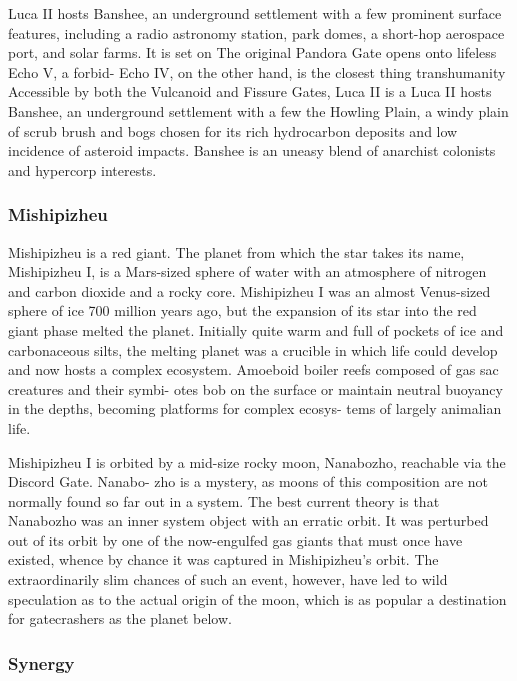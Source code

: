 Luca II hosts Banshee, an underground settlement with a few 
prominent surface features, including a radio astronomy station, 
park domes, a short-hop aerospace port, and solar farms. It is set on 
The original Pandora Gate opens onto lifeless Echo V, a forbid-
Echo IV, on the other hand, is the closest thing transhumanity 
Accessible by both the Vulcanoid and Fissure Gates, Luca II is a 
Luca II hosts Banshee, an underground settlement with a few 
the Howling Plain, a windy plain of scrub brush and 
bogs chosen for its rich hydrocarbon deposits and low 
incidence of asteroid impacts. Banshee is an uneasy 
blend of anarchist colonists and hypercorp interests.

\subsubsection{Mishipizheu}

Mishipizheu is a red giant. The planet from which 
the star takes its name, Mishipizheu I, is a Mars-sized 
sphere of water with an atmosphere of nitrogen and 
carbon dioxide and a rocky core. Mishipizheu I was 
an almost Venus-sized sphere of ice 700 million years 
ago, but the expansion of its star into the red giant 
phase melted the planet. Initially quite warm and full 
of pockets of ice and carbonaceous silts, the melting 
planet was a crucible in which life could develop and 
now hosts a complex ecosystem. Amoeboid boiler 
reefs composed of gas sac creatures and their symbi-
otes bob on the surface or maintain neutral buoyancy 
in the depths, becoming platforms for complex ecosys-
tems of largely animalian life.

Mishipizheu I is orbited by a mid-size rocky moon, 
Nanabozho, reachable via the Discord Gate. Nanabo-
zho is a mystery, as moons of this composition are 
not normally found so far out in a system. The best 
current theory is that Nanabozho was an inner system 
object with an erratic orbit. It was perturbed out of 
its orbit by one of the now-engulfed gas giants that 
must once have existed, whence by chance it was 
captured in Mishipizheu's orbit. The extraordinarily 
slim chances of such an event, however, have led to 
wild speculation as to the actual origin of the moon, 
which is as popular a destination for gatecrashers as 
the planet below.

\subsubsection{Synergy}

